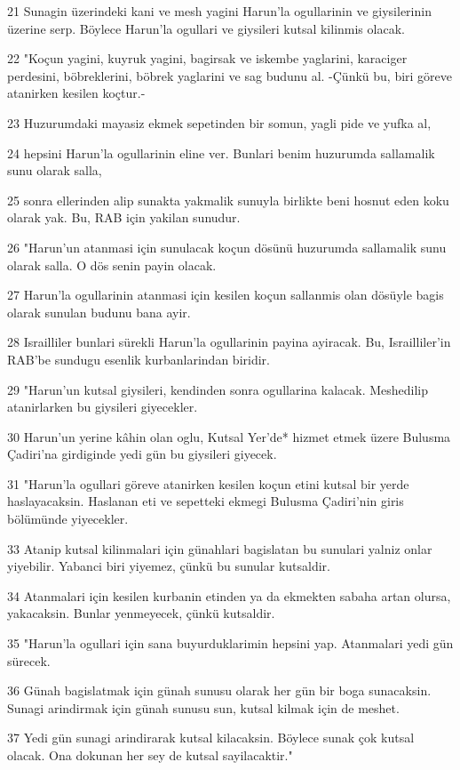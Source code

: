 \par 21 Sunagin üzerindeki kani ve mesh yagini Harun'la ogullarinin ve giysilerinin üzerine serp. Böylece Harun'la ogullari ve giysileri kutsal kilinmis olacak.
\par 22 "Koçun yagini, kuyruk yagini, bagirsak ve iskembe yaglarini, karaciger perdesini, böbreklerini, böbrek yaglarini ve sag budunu al. -Çünkü bu, biri göreve atanirken kesilen koçtur.-
\par 23 Huzurumdaki mayasiz ekmek sepetinden bir somun, yagli pide ve yufka al,
\par 24 hepsini Harun'la ogullarinin eline ver. Bunlari benim huzurumda sallamalik sunu olarak salla,
\par 25 sonra ellerinden alip sunakta yakmalik sunuyla birlikte beni hosnut eden koku olarak yak. Bu, RAB için yakilan sunudur.
\par 26 "Harun'un atanmasi için sunulacak koçun dösünü huzurumda sallamalik sunu olarak salla. O dös senin payin olacak.
\par 27 Harun'la ogullarinin atanmasi için kesilen koçun sallanmis olan dösüyle bagis olarak sunulan budunu bana ayir.
\par 28 Israilliler bunlari sürekli Harun'la ogullarinin payina ayiracak. Bu, Israilliler'in RAB'be sundugu esenlik kurbanlarindan biridir.
\par 29 "Harun'un kutsal giysileri, kendinden sonra ogullarina kalacak. Meshedilip atanirlarken bu giysileri giyecekler.
\par 30 Harun'un yerine kâhin olan oglu, Kutsal Yer'de* hizmet etmek üzere Bulusma Çadiri'na girdiginde yedi gün bu giysileri giyecek.
\par 31 "Harun'la ogullari göreve atanirken kesilen koçun etini kutsal bir yerde haslayacaksin. Haslanan eti ve sepetteki ekmegi Bulusma Çadiri'nin giris bölümünde yiyecekler.
\par 33 Atanip kutsal kilinmalari için günahlari bagislatan bu sunulari yalniz onlar yiyebilir. Yabanci biri yiyemez, çünkü bu sunular kutsaldir.
\par 34 Atanmalari için kesilen kurbanin etinden ya da ekmekten sabaha artan olursa, yakacaksin. Bunlar yenmeyecek, çünkü kutsaldir.
\par 35 "Harun'la ogullari için sana buyurduklarimin hepsini yap. Atanmalari yedi gün sürecek.
\par 36 Günah bagislatmak için günah sunusu olarak her gün bir boga sunacaksin. Sunagi arindirmak için günah sunusu sun, kutsal kilmak için de meshet.
\par 37 Yedi gün sunagi arindirarak kutsal kilacaksin. Böylece sunak çok kutsal olacak. Ona dokunan her sey de kutsal sayilacaktir."
